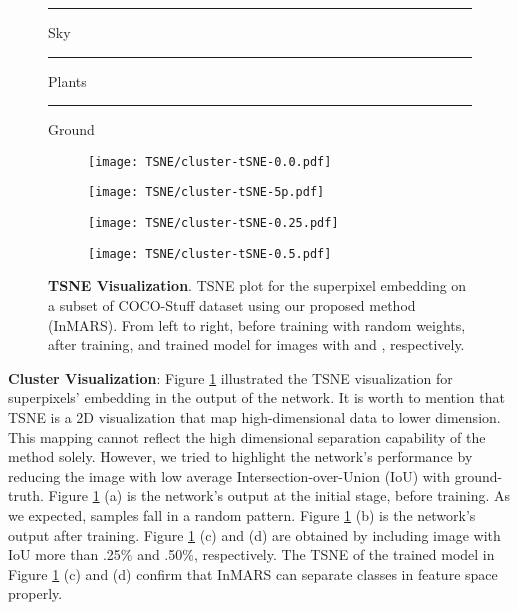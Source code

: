 \documentclass[letterpaper, 10 pt, journal, twoside]{IEEEtran}
\newcommand\crule[3][black]{\textcolor{#1}{\rule{#2}{#3}}}
\begin{document}
\begin{figure}[!tb]
    
    \centering
    \crule[colorSky]{.15cm}{.15cm}
    \small{Sky}
    \crule[colorPlants]{.15cm}{.15cm}
    \small{Plants}
    \crule[colorGround]{.15cm}{.15cm}
    \small{Ground}
    
    \vspace*{0in}
    \begin{subfigure}[t]{0.115\textwidth}
    
     \texttt{[image: TSNE/cluster-tSNE-0.0.pdf]}
    \vspace*{-\baselineskip}
    \end{subfigure}
    \begin{subfigure}[t]{0.115\textwidth}
      \texttt{[image: TSNE/cluster-tSNE-5p.pdf]}
    \vspace*{-\baselineskip}
    \end{subfigure}
    \begin{subfigure}[t]{0.115\textwidth}
      \texttt{[image: TSNE/cluster-tSNE-0.25.pdf]}
    \vspace*{-\baselineskip}
    \end{subfigure}
    \begin{subfigure}[t]{0.115\textwidth}
      \texttt{[image: TSNE/cluster-tSNE-0.5.pdf]}
    \vspace*{-\baselineskip}
    \end{subfigure}    
    \caption{\textbf{TSNE Visualization}. TSNE plot for the superpixel embedding on a subset of COCO-Stuff dataset using our proposed method (InMARS). From left to right, before training with random weights, after training, and trained model for images with  and , respectively.}
    \label{fig:tsne:coco-st3}
  \end{figure}

\textbf{Cluster Visualization}: Figure \ref{fig:tsne:coco-st3} illustrated the TSNE visualization for superpixels' embedding in the output of the network. It is worth to mention that TSNE is a 2D visualization that map high-dimensional data to lower dimension. This mapping cannot reflect the high dimensional separation capability of the method solely. However, we tried to highlight the network's performance by reducing the image with low average Intersection-over-Union (IoU) with ground-truth. Figure \ref{fig:tsne:coco-st3} (a) is the network's output at the initial stage, before training. As we expected, samples fall in a random pattern. Figure \ref{fig:tsne:coco-st3} (b) is the network's output after training. Figure \ref{fig:tsne:coco-st3} (c) and (d) are obtained by including image with IoU more than .25\% and .50\%, respectively. The TSNE of the trained model in Figure \ref{fig:tsne:coco-st3} (c) and (d) confirm that InMARS can separate classes in feature space properly.
\end{document}
